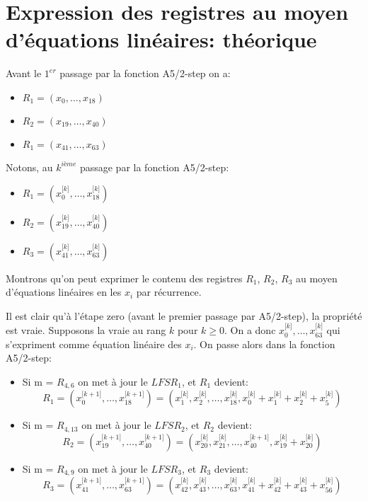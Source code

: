 \section{Expression des registres au moyen d’équations linéaires: théorique}


Avant le $1^{er}$ passage par la fonction A5/2-step on a: 
\begin{itemize}
\item $R_1 = (x_0, \ldots, x_{18})$
\item $R_2 = (x_{19}, \ldots, x_{40})$
\item $R_1 = (x_{41}, \ldots, x_{63})$
\end{itemize}

Notons, au $k^{ième}$ passage par la fonction A5/2-step:
\begin{itemize}
\item $R_1 = (x^{\lbrack k\rbrack}_0, \ldots, x^{\lbrack k \rbrack}_{18})$
\item $R_2 = (x^{\lbrack k \rbrack}_{19}, \ldots, x^{\lbrack k \rbrack}_{40})$
\item $R_3 = (x^{\lbrack k \rbrack}_{41}, \ldots, x^{\lbrack k \rbrack}_{63})$
\end{itemize}

Montrons qu'on peut exprimer le contenu des registres $R_1$, $R_2$, $R_3$ au moyen d'équations linéaires en les $x_i$ par récurrence.

Il est clair qu'à l'étape zero (avant le premier passage par A5/2-step), la propriété est vraie.
Supposons la vraie au rang $k$ pour $k \geq 0$.
On a donc $x^{\lbrack k\rbrack}_0, \ldots, x^{\lbrack k \rbrack}_{63}$ qui s'expriment comme équation linéaire des $x_i$.
On passe alors dans la fonction A5/2-step:
\begin{itemize}
\item Si m = $R_{4,6}$ on met à jour le $LFSR_1$, et $R_1$ devient:
$$R_1 = (x^{\lbrack k+1\rbrack}_0, \ldots, x^{\lbrack k+1 \rbrack}_{18}) = (x^{\lbrack k\rbrack}_1, x^{\lbrack k\rbrack}_2, \ldots, x^{\lbrack k \rbrack}_{18}, x^{\lbrack k\rbrack}_0 + x^{\lbrack k\rbrack}_1 + x^{\lbrack k\rbrack}_2 + x^{\lbrack k\rbrack}_5)$$
\item Si m = $R_{4,13}$ on met à jour le $LFSR_2$, et $R_2$ devient:
$$R_2 = (x^{\lbrack k+1\rbrack}_{19}, \ldots, x^{\lbrack k+1 \rbrack}_{40}) = (x^{\lbrack k\rbrack}_{20},x^{\lbrack k\rbrack}_{21}, \ldots, x^{\lbrack k+1 \rbrack}_{40}, x^{\lbrack k\rbrack}_{19} + x^{\lbrack k\rbrack}_{20})$$
\item Si m = $R_{4,9}$ on met à jour le $LFSR_3$, et $R_3$ devient:
$$R_3 = (x^{\lbrack k+1\rbrack}_{41}, \ldots, x^{\lbrack k+1 \rbrack}_{63}) = (x^{\lbrack k\rbrack}_{42}, x^{\lbrack k\rbrack}_{43}, \ldots, x^{\lbrack k\rbrack}_{63},x^{\lbrack k\rbrack}_{41} + x^{\lbrack k\rbrack}_{42}+ x^{\lbrack k\rbrack}_{43}+ x^{\lbrack k\rbrack}_{56})$$
\end{itemize}

